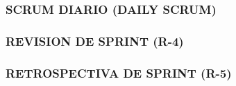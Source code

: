 \begin{doublespace}
\subsubsection{SCRUM DIARIO (DAILY SCRUM)}




\subsubsection{REVISION DE SPRINT (R-4)}




\subsubsection{RETROSPECTIVA DE SPRINT (R-5)}


\end{doublespace}
